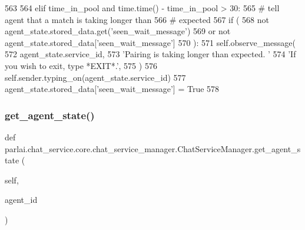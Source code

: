 \begin{DoxyCode}
563 
564             \textcolor{keywordflow}{elif} time\_in\_pool \textcolor{keywordflow}{and} time.time() - time\_in\_pool > 30:
565                 \textcolor{comment}{# tell agent that a match is taking longer than}
566                 \textcolor{comment}{# expected}
567                 \textcolor{keywordflow}{if} (
568                     \textcolor{keywordflow}{not} agent\_state.stored\_data.get(\textcolor{stringliteral}{'seen\_wait\_message'})
569                     \textcolor{keywordflow}{or} \textcolor{keywordflow}{not} agent\_state.stored\_data[\textcolor{stringliteral}{'seen\_wait\_message'}]
570                 ):
571                     self.observe\_message(
572                         agent\_state.service\_id,
573                         \textcolor{stringliteral}{'Pairing is taking longer than expected. '}
574                         \textcolor{stringliteral}{'If you wish to exit, type *EXIT*.'},
575                     )
576                     self.sender.typing\_on(agent\_state.service\_id)
577                     agent\_state.stored\_data[\textcolor{stringliteral}{'seen\_wait\_message'}] = \textcolor{keyword}{True}
578 
\end{DoxyCode}
\mbox{\label{classparlai_1_1chat__service_1_1core_1_1chat__service__manager_1_1ChatServiceManager_ac88107eb2a55878dad8ceb4c90acff5b}} 
\subsubsection{\texorpdfstring{get\+\_\+agent\+\_\+state()}{get\_agent\_state()}}
{\footnotesize\ttfamily def parlai.\+chat\+\_\+service.\+core.\+chat\+\_\+service\+\_\+manager.\+Chat\+Service\+Manager.\+get\+\_\+agent\+\_\+state (\begin{DoxyParamCaption}\item[{}]{self,  }\item[{}]{agent\+\_\+id }\end{DoxyParamCaption})}


